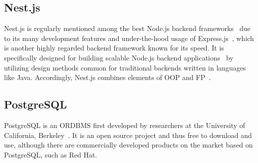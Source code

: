 \subsection{Nest.js}\label{subsec:nest.js}

Nest.js is regularly mentioned among the best Node.js backend frameworks~\autocites{clever_solution_9_2020}{labay_10_2020}{patel_top_2022} due to its many development features and under-the-hood usage of Express.js~\autocite{mysliwiec_documentation_nodate}, which is another highly regarded backend framework known for its speed.
It is specifically designed for building scalable Node.js backend applications~\autocite{mysliwiec_documentation_nodate} by utilizing design methods common for traditional backends written in languages like Java.
Accordingly, Nest.js combines elements of \gls{OOP} and \gls{FP}~\autocite{mysliwiec_documentation_nodate}.

\subsection{PostgreSQL}\label{subsec:postgresql}

PostgreSQL is an \gls{ORDBMS} first developed by researchers at the University of California, Berkeley~\autocite[3]{worsley_practical_2002}.
It is an open source project and thus free to download and use, although there are commercially developed products on the market based on PostgreSQL, such as Red Hat.

